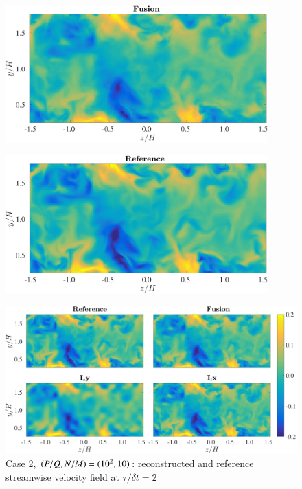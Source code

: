 \documentclass{beamer}
\begin{document}
\begin{frame}
\begin{overprint}
\begin{figure}
			\end{figure}
			\begin{figure}
				\centering
				\includegraphics[width=0.9\textwidth]{./figures/comparisons/channel/improper_outer_spacespacing_10_timespacing_10_fusion_t002.png}
			\end{figure}
			\begin{figure}
				\centering
				\includegraphics[width=0.9\textwidth]{./figures/comparisons/channel/improper_outer_spacespacing_10_timespacing_10_ref_t002.png}
			\end{figure}												
			\begin{figure}
				\centering
				\includegraphics[width=\textwidth]{./figures/comparisons/channel/improper_outer_spacespacing_10_timespacing_10_subplots_t002.png}
				\caption*{Case 2, $ (P/Q,N/M) = (10^2,10) $: reconstructed and reference streamwise velocity field at $ \tau/\delta t = 2$}
			\end{figure}
	\end{overprint}
\end{frame}
\end{document}
